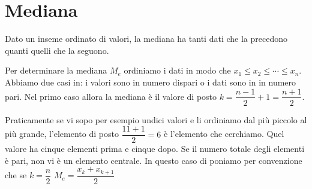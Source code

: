 \section{Mediana}
\begin{defn}[Mediana]
Dato un inseme ordinato di valori, la mediana  ha tanti dati che la precedono quanti quelli che la seguono.
\end{defn}
Per determinare la mediana $M_e$ ordiniamo i dati in modo che $x_1\leq x_2\leq\cdots\leq x_n $. Abbiamo due casi in: i valori sono in numero dispari o i dati sono in in numero pari. Nel primo caso allora la mediana è il valore di posto $k=\dfrac{n-1}{2}+1=\dfrac{n+1}{2}$. 

Praticamente se vi sopo per esempio undici valori e li ordiniamo dal più piccolo al più grande, l'elemento di posto $ \dfrac{11+1}{2}=6$ è l'elemento che cerchiamo. Quel valore ha cinque elementi prima e cinque dopo. Se il numero totale  degli elementi è pari, non vi è un elemento centrale. In questo caso di poniamo  per convenzione che se $k=\dfrac{n}{2}$ $M_e=\dfrac{x_k+x_{k+1}}{2}$